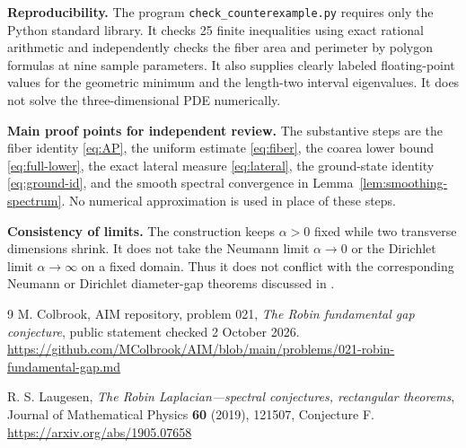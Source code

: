 \documentclass[11pt,a4paper]{article}
\theoremstyle{remark}
\begin{document}
\textbf{Reproducibility.} The program \texttt{check\_counterexample.py} requires only the Python standard library. It checks 25 finite inequalities using exact rational arithmetic and independently checks the fiber area and perimeter by polygon formulas at nine sample parameters. It also supplies clearly labeled floating-point values for the geometric minimum and the length-two interval eigenvalues. It does not solve the three-dimensional PDE numerically.

\textbf{Main proof points for independent review.} The substantive steps are the fiber identity \eqref{eq:AP}, the uniform estimate \eqref{eq:fiber}, the coarea lower bound \eqref{eq:full-lower}, the exact lateral measure \eqref{eq:lateral}, the ground-state identity \eqref{eq:ground-id}, and the smooth spectral convergence in Lemma~\ref{lem:smoothing-spectrum}. No numerical approximation is used in place of these steps.

\textbf{Consistency of limits.} The construction keeps $\alpha>0$ fixed while two transverse dimensions shrink. It does not take the Neumann limit $\alpha\to0$ or the Dirichlet limit $\alpha\to\infty$ on a fixed domain. Thus it does not conflict with the corresponding Neumann or Dirichlet diameter-gap theorems discussed in \cite{laugesen}.

\begingroup\raggedright
\begin{thebibliography}{9}
M. Colbrook, AIM repository, problem 021, \emph{The Robin fundamental gap conjecture}, public statement checked 2 October 2026.\\
\url{https://github.com/MColbrook/AIM/blob/main/problems/021-robin-fundamental-gap.md}

R. S. Laugesen, \emph{The Robin Laplacian---spectral conjectures, rectangular theorems}, Journal of Mathematical Physics \textbf{60} (2019), 121507, Conjecture F.\\
\url{https://arxiv.org/abs/1905.07658}
\end{thebibliography}
\endgroup
\end{document}
